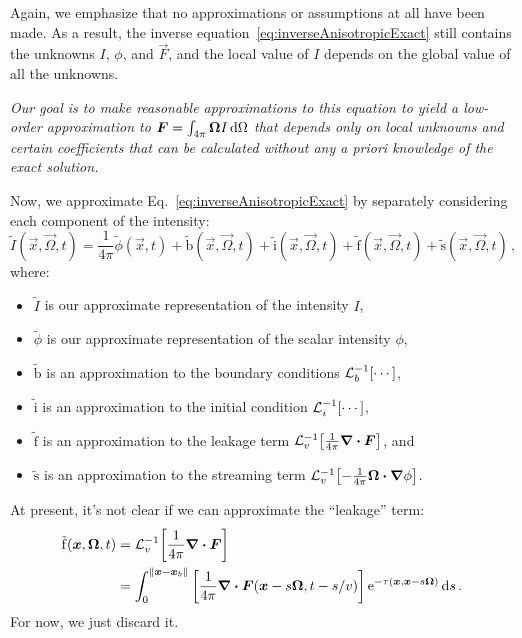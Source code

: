 Again, we emphasize that no approximations or assumptions at all have been
made. As a
result, the inverse equation~\eqref{eq:inverseAnisotropicExact} still contains
the unknowns $I$, $\phi$, and $\vec{F}$, and the local value of
$I$ depends on the global value of all the unknowns.

\emph{
Our goal is to make reasonable approximations to this equation to yield a
low-order approximation to $\bm{F}=\int_{4\pi}\bm{\Omega} I \mathop{}\!\mathrm{d} \Omega$ that
depends only on local unknowns and certain coefficients that can be calculated
without any \emph{a priori} knowledge of the exact solution.
}

Now, we approximate Eq.~\eqref{eq:inverseAnisotropicExact} by
separately considering each component of the intensity:
\begin{equation}\label{eq:approxIntensity1}
  \tilde I(\vec{x}, \vec{\Omega}, t)
  = \frac1{4\pi} \tilde \phi(\vec{x}, t) 
  + \mathrm{ \tilde b }(\vec{x}, \vec{\Omega}, t)
  + \mathrm{ \tilde i }(\vec{x}, \vec{\Omega}, t)
  + \mathrm{ \tilde f }(\vec{x}, \vec{\Omega}, t)
  + \mathrm{ \tilde s }(\vec{x}, \vec{\Omega}, t) \,,
\end{equation}
where:
\prelistpar\begin{itemize}
  \item $\tilde I$ is our approximate representation of the intensity $I$,
  \item $\tilde \phi$ is our approximate representation of the scalar intensity
    $\phi$,
  \item $\mathrm{ \tilde b }$ is an approximation to the boundary conditions
    $\mathcal{L}_{b}^{-1}\!\left[\cdots\right]$,
  \item $\mathrm{ \tilde i }$ is an approximation to the initial condition 
    $\mathcal{L}_{i}^{-1}\!\left[\cdots\right]$,
  \item $\mathrm{ \tilde f }$ is an approximation to the leakage term
    $\mathcal{L}_{v}^{-1}\!\left[ \frac1{4\pi} \bm{\nabla} \bm{\cdot} \bm{F} \right]$, and
  \item $\mathrm{ \tilde s }$ is an approximation to the streaming term
    $\mathcal{L}_{v}^{-1}\!\left[ -\frac1{4\pi} \bm{\Omega}\bm{\cdot} \bm{\nabla} \phi \right]$.
\end{itemize}

At present, it's not clear if we can approximate the ``leakage'' term:
\begin{align*}
  \mathrm{ \tilde f }(\bm{x}, \bm{\Omega}, t) &=
   \mathcal{L}_{v}^{-1}\!\left[ \frac1{4\pi}\bm{\nabla} \bm{\cdot} \bm{F} \right]
  \\
  &= \int_{0}^{\left\| \bm{x} - \bm{x}_b \right\|}
    \left[ \frac1{4\pi}\bm{\nabla} \bm{\cdot} \bm{F}(\bm{x} - s \bm{\Omega}, t-s/v)
    \right]
    \mathop{}\!\mathrm{e}^{ -\tau(\bm{x}, \bm{x} - s \bm{\Omega})}
    \mathop{}\!\mathrm{d} s \,.
\end{align*}
For now, we just discard it.

